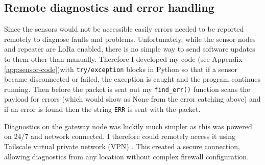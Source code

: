 \subsection{Remote diagnostics and error handling}

Since the sensors would not be accessible easily errors needed to be reported
remotely to diagnose faults and problems. Unfortunately, while the sensor nodes
and repeater are LoRa enabled, there is no simple way to send software updates
to them other than manually. Therefore I developed my code (see Appendix
\ref{app:sensor-code})with \texttt{try/exception} blocks in Python so that if a
sensor became disconnected or failed, the exception is caught and the program
continues running. Then before the packet is sent out my \texttt{find\_err()}
function scans the payload for errors (which would show as None from the error
catching above) and if an error is found then the string \texttt{ERR} is sent
with the packet.

Diagnostics on the gateway node was luckily much simpler as this was powered on
24/7 and network connected. I therefore could remotely access it using Tailscale
virtual private network (VPN) \cite{tailscale_2025}. This created a secure
connection, allowing diagnostics from any location without complex firewall
configuration.